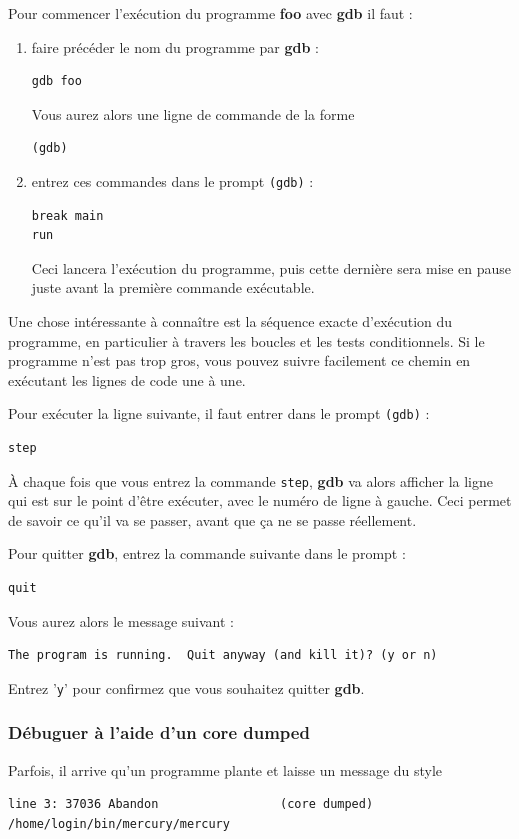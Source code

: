 \documentclass[a4paper,twoside]{article}
\begin{document}
\bigskip

Pour commencer l'exécution du programme \textbf{foo} avec \textbf{gdb} il faut : 
\begin{enumerate}
\item faire précéder le nom du programme par \textbf{gdb} : 
\begin{verbatim}
gdb foo
\end{verbatim}
Vous aurez alors une ligne de commande de la forme 
\begin{verbatim}
(gdb) 
\end{verbatim}
\item entrez ces commandes dans le prompt \texttt{(gdb)} :
\begin{verbatim}
break main
run
\end{verbatim}
Ceci lancera l'exécution du programme, puis cette dernière sera mise en pause juste avant la première commande exécutable.
\end{enumerate}

\bigskip

Une chose intéressante à connaître est la séquence exacte d'exécution du programme, en particulier à travers les boucles et les tests conditionnels. Si le programme n'est pas trop gros, vous pouvez suivre facilement ce chemin en exécutant les lignes de code une à une. 

Pour exécuter la ligne suivante, il faut entrer dans le prompt \texttt{(gdb)} :
\begin{verbatim}
step
\end{verbatim}

À chaque fois que vous entrez la commande \texttt{step}, \textbf{gdb} va alors afficher la ligne qui est sur le point d'être exécuter, avec le numéro de ligne à gauche. Ceci permet de savoir ce qu'il va se passer, avant que ça ne se passe réellement.

\bigskip

Pour quitter \textbf{gdb}, entrez la commande suivante dans le prompt : 
\begin{verbatim}
quit
\end{verbatim}
Vous aurez alors le message suivant : 
\begin{verbatim}
The program is running.  Quit anyway (and kill it)? (y or n)
\end{verbatim}
Entrez '\texttt{y}' pour confirmez que vous souhaitez quitter \textbf{gdb}.

\subsubsection{Débuguer à l'aide d'un core dumped}
Parfois, il arrive qu'un programme plante et laisse un message du style
\begin{verbatim}
line 3: 37036 Abandon                 (core dumped) /home/login/bin/mercury/mercury
\end{verbatim}
\end{document}
